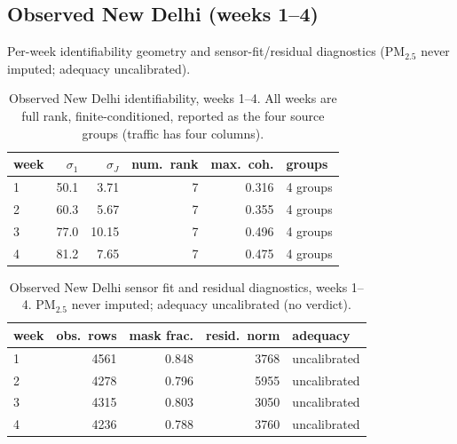 \subsection{Observed New Delhi (weeks 1--4)}
Per-week identifiability geometry and sensor-fit/residual diagnostics (PM$_{2.5}$
never imputed; adequacy uncalibrated).
\begin{table}[t]
\centering
\footnotesize
\caption{Observed New Delhi identifiability, weeks 1--4. All weeks are full rank,
finite-conditioned, reported as the four source groups (traffic has four columns).}
\label{tab:results_nd_ident}
\begin{tabular}{lrrrrl}
\toprule
week & $\sigma_1$ & $\sigma_J$ & num.\ rank & max.\ coh. & groups \\
\midrule
1 & 50.1 & 3.71  & 7 & 0.316 & 4 groups \\
2 & 60.3 & 5.67  & 7 & 0.355 & 4 groups \\
3 & 77.0 & 10.15 & 7 & 0.496 & 4 groups \\
4 & 81.2 & 7.65  & 7 & 0.475 & 4 groups \\
\bottomrule
\end{tabular}
\end{table}
\begin{table}[t]
\centering
\footnotesize
\caption{Observed New Delhi sensor fit and residual diagnostics, weeks 1--4.
PM$_{2.5}$ never imputed; adequacy uncalibrated (no verdict).}
\label{tab:results_nd_resid}
\begin{tabular}{lrrrl}
\toprule
week & obs.\ rows & mask frac. & resid.\ norm & adequacy \\
\midrule
1 & 4561 & 0.848 & 3768 & uncalibrated \\
2 & 4278 & 0.796 & 5955 & uncalibrated \\
3 & 4315 & 0.803 & 3050 & uncalibrated \\
4 & 4236 & 0.788 & 3760 & uncalibrated \\
\bottomrule
\end{tabular}
\end{table}

